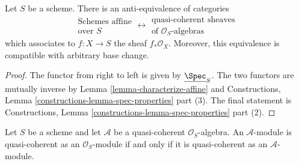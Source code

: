 \begin{lemma}
\label{lemma-affine-equivalence-algebras}
Let $S$ be a scheme. There is an anti-equivalence of categories
$$
\begin{matrix}
\text{Schemes affine} \\
\text{over }S
\end{matrix}
\longleftrightarrow
\begin{matrix}
\text{quasi-coherent sheaves} \\
\text{of }\mathcal{O}_S\text{-algebras}
\end{matrix}
$$
which associates to $f : X \to S$ the sheaf $f_*\mathcal{O}_X$.
Moreover, this equivalence is compatible with arbitrary base change.
\end{lemma}

\begin{proof}
The functor from right to left is given by $\underline{\Spec}_S$.
The two functors are mutually inverse by
Lemma \ref{lemma-characterize-affine} and
Constructions, Lemma \ref{constructions-lemma-spec-properties} part (3).
The final statement is
Constructions, Lemma \ref{constructions-lemma-spec-properties} part (2).
\end{proof}

\begin{lemma}
\label{lemma-quasi-coherence-scalar-restriction}
\begin{reference}
\cite[I, Proposition 9.6.1]{EGA}
\end{reference}
Let $S$ be a scheme and let $\mathcal{A}$ be a quasi-coherent
$\mathcal{O}_S$-algebra. An $\mathcal{A}$-module is
quasi-coherent as an $\mathcal{O}_S$-module if and only if
it is quasi-coherent as an $\mathcal{A}$-module.
\end{lemma}

